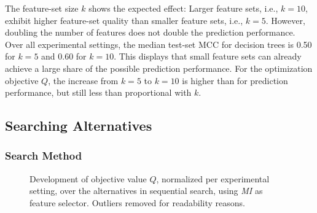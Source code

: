 \documentclass[conference]{IEEEtran}
\theoremstyle{definition}
\begin{document}
The feature-set size $k$ shows the expected effect:
Larger feature sets, i.e., $k=10$, exhibit higher feature-set quality than smaller feature sets, i.e., $k=5$.
However, doubling the number of features does not double the prediction performance.
Over all experimental settings, the median test-set MCC for decision trees is 0.50 for $k=5$ and 0.60 for $k=10$.
This displays that small feature sets can already achieve a large share of the possible prediction performance.
For the optimization objective $Q$, the increase from $k=5$ to $k=10$ is higher than for prediction performance, but still less than proportional with $k$.

\subsection{Searching Alternatives}

\subsubsection{Search Method}

\begin{figure}[t]
	\centering
	\hfill
	\caption{Development of objective value $Q$, normalized per experimental setting, over the alternatives in sequential search, using \emph{MI} as feature selector.
		Outliers removed for readability reasons.}
	\label{fig:impact-num-alternatives-objective}
\end{figure}
\end{document}
